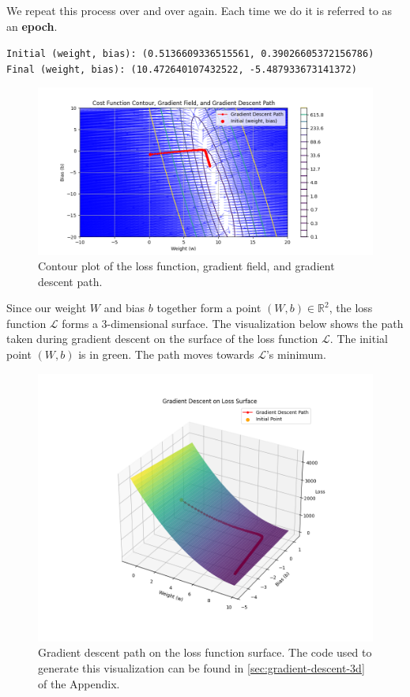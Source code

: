 We repeat this process over and over again. Each time we do it is referred to as an \textbf{epoch}. 



\texttt{\small{Initial (weight, bias): (0.5136609336515561, 0.39026605372156786)\\
Final (weight, bias): (10.472640107432522, -5.487933673141372)
}}

\begin{figure}[H]
    \centering
    \includegraphics[width=330pt]{Regression/code/gradient-field-2.png}
    \caption{Contour plot of the loss function, gradient field, and gradient descent path.}
    \label{fig:linear4}
\end{figure}

Since our weight $W$ and bias $b$ together form a point $(W,b)\in\mathbb{R}^2$, the loss function $\mathcal{L}$ forms a 3-dimensional surface. The visualization below shows the path taken during gradient descent on the surface of the loss function $\mathcal{L}$. The initial point $(W,b)$ is in green. The path moves towards $\mathcal{L}$'s minimum. 

\begin{figure}[H]
\centering
\includegraphics[width=330pt]{Regression/code/gradient-descent-3d.png}
\caption{Gradient descent path on the loss function surface. The code used to generate this visualization can be found in \ref{sec:gradient-descent-3d} of the Appendix.}
\label{fig:linear5}
\end{figure}

